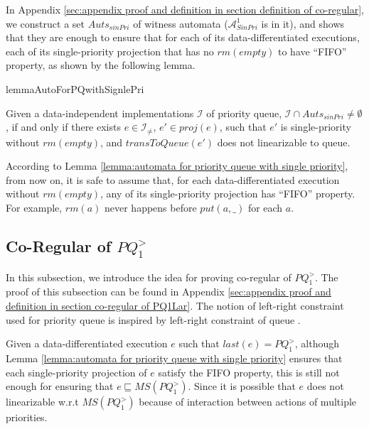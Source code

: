 In Appendix \ref{sec:appendix proof and definition in section definition of co-regular}, we construct a set $\textit{Auts}_{\textit{sinPri}}$ of witness automata ($\mathcal{A}_{\textit{SinPri}}^1$ is in it), and shows that they are enough to ensure that for each of its data-differentiated executions, each of its single-priority projection that has no $\textit{rm}(\textit{empty})$ to have ``FIFO'' property, as shown by the following lemma.

\begin{restatable}{lemma}{AutoForPQwithSignlePri}
\label{lemma:automata for priority queue with single priority}

Given a data-independent implementations $\mathcal{I}$ of priority queue, $\mathcal{I} \cap \textit{Auts}_{\textit{sinPri}} \neq \emptyset$, if and only if there exists $e \in \mathcal{I}_{\neq}$, $e' \in \textit{proj}(e)$, such that $e'$ is single-priority  without $\textit{rm}(\textit{empty})$, and $\textit{transToQueue}(e')$ does not linearizable to queue.
\end{restatable}

According to Lemma \ref{lemma:automata for priority queue with single priority}, from now on, it is safe to assume that, for each data-differentiated execution without $\textit{rm}(\textit{empty})$, any of its single-priority projection has ``FIFO'' property. For example, $\textit{rm}(a)$ never happens before $\textit{put}(a,\_)$ for each $a$.



\subsection{Co-Regular of $\textit{PQ}_1^{>}$}
\label{subsec:co-regular of PQ1Lar}

In this subsection, we introduce the idea for proving co-regular of $\textit{PQ}_1^{>}$. The proof of this subsection can be found in Appendix \ref{sec:appendix proof and definition in section co-regular of PQ1Lar}. The notion of left-right constraint used for priority queue is inspired by left-right constraint of queue \cite{Bouajjani:2015}.

Given a data-differentiated execution $e$ such that $\textit{last}(e) = \textit{PQ}_1^{>}$, although Lemma \ref{lemma:automata for priority queue with single priority} ensures that each single-priority projection of $e$ satisfy the FIFO property, this is still not enough for ensuring that $e \sqsubseteq \textit{MS}(\textit{PQ}_1^{>})$. Since it is possible that $e$ does not linearizable w.r.t $\textit{MS}(\textit{PQ}_1^{>})$ because of interaction between actions of multiple priorities.

